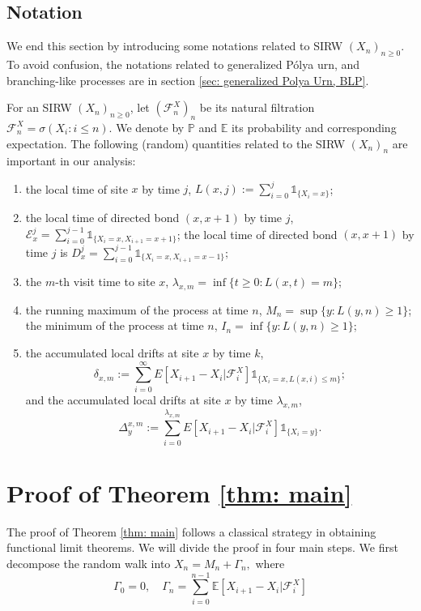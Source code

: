 \documentclass[twoside,12pt,a4paper]{article}
\numberwithin{equation}{section}
\begin{document}
\subsection{Notation}
We end this section by introducing some notations related to SIRW $(X_n)_{n\geq 0}$. To avoid confusion, the notations related to generalized P\'{o}lya urn, and branching-like processes are in section \ref{sec: generalized Polya Urn, BLP}.

For an SIRW $(X_n)_{n\geq 0}$,  let $(\mathcal{F}^X_n)_n$ be its natural filtration $\mathcal{F}^X_n = \sigma\left(X_i: i\leq n \right).$ We denote by $\mathbb{P}$ and $\mathbb{E}$ its probability and corresponding expectation. The following (random) quantities related to the SIRW $(X_n)_n$ are important in our analysis:
\begin{enumerate}
	\item the local time of site $x$ by time $j$, $L(x,j):= \sum_{i=0}^j \mathbb{1}_{\{X_i=x\} }$;
	
	\item the local time of directed bond $(x,x+1)$ by time $j$,
	$ \mathcal{E}^j_x = \sum_{i=0}^{j-1} \mathbb{1}_{\{X_i=x, X_{i+1} =x+1 \} } $; the local time of directed bond $(x,x+1)$ by time $j$ is $ D^j_x = \sum_{i=0}^{j-1} \mathbb{1}_{\{X_i=x, X_{i+1} =x-1 \} }; $
	
	
	\item the $m$-th visit time to site $x$, $\lambda_{x,m} = \inf\{t \geq 0: L(x,t) = m\}$;
	
	\item the running maximum of the process at time $n$, $M_n= \sup\{y: L(y,n)\geq 1 \} $; the minimum of the process at time $n$, $I_n= \inf\{y: L(y,n)\geq 1 \} $;
	
	\item the accumulated local drifts at site $x$ by time $k$, $$\delta_{x,m}:= \sum_{i=0}^\infty E[X_{i+1}-X_i\vert \mathcal{F}_{i}^X] \mathbb{1}_{\{X_i=x, L(x,i)\leq m\}};$$
	and the accumulated local drifts at site $x$ by time $\lambda_{x,m}$, 
	\begin{equation}\label{eq: accumulated local drift}
	\Delta_y^{x,m}:= \sum_{i=0}^{\lambda_{x,m}} E[X_{i+1}-X_i\vert \mathcal{F}_{i}^X] \mathbb{1}_{\{X_i=y\}}.
	\end{equation}
\end{enumerate}

\section{Proof of Theorem \ref{thm: main}}\label{sec: proof of main}
The proof of Theorem \ref{thm: main} follows a classical strategy in obtaining functional limit theorems. We will divide the proof in four main steps. We first decompose the random walk into
$X_n = M_n+ \Gamma_n, $ where
$$ 
\Gamma_0 = 0, \quad \Gamma_n = \sum_{i=0}^{n-1} \mathbb{E}\left[ X_{i+1}-X_i | \mathcal{F}_i^X \right]
$$ 
\end{document}
